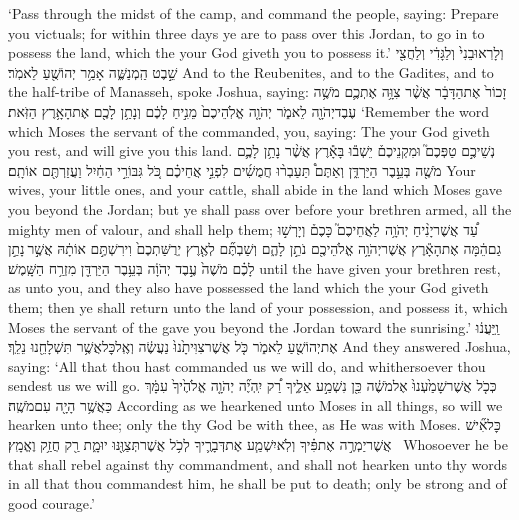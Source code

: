 {‘Pass through the midst of the camp, and command the people, saying: Prepare you victuals; for within three days ye are to pass over this Jordan, to go in to possess the land, which the \lord\space your God giveth you to possess it.’}
{וְלָרֽאוּבֵנִי֙ וְלַגָּדִ֔י וְלַחֲצִ֖י שֵׁ֣בֶט הַֽמְנַשֶּׁ֑ה אָמַ֥ר יְהוֹשֻׁ֖עַ לֵאמֹֽר׃}
{And to the Reubenites, and to the Gadites, and to the half-tribe of Manasseh, spoke Joshua, saying:}
{זָכוֹר֙ אֶת\maqqaf הַדָּבָ֔ר אֲשֶׁ֨ר צִוָּ֥ה אֶתְכֶ֛ם מֹשֶׁ֥ה עֶבֶד\maqqaf יְהֹוָ֖ה לֵאמֹ֑ר יְהֹוָ֤ה אֱלֹֽהֵיכֶם֙ מֵנִ֣יחַ לָכֶ֔ם וְנָתַ֥ן לָכֶ֖ם אֶת\maqqaf הָאָ֥רֶץ הַזֹּֽאת׃}
{‘Remember the word which Moses the servant of the \lord\space commanded, you, saying: The \lord\space your God giveth you rest, and will give you this land.}
{נְשֵׁיכֶ֣ם טַפְּכֶם֮ וּמִקְנֵיכֶם֒ יֵשְׁב֕וּ בָּאָ֕רֶץ אֲשֶׁ֨ר נָתַ֥ן לָכֶ֛ם מֹשֶׁ֖ה בְּעֵ֣בֶר הַיַּרְדֵּ֑ן וְאַתֶּם֩ תַּעַבְר֨וּ חֲמֻשִׁ֜ים לִפְנֵ֣י אֲחֵיכֶ֗ם כֹּ֚ל גִּבּוֹרֵ֣י הַחַ֔יִל וַעֲזַרְתֶּ֖ם אוֹתָֽם׃}
{Your wives, your little ones, and your cattle, shall abide in the land which Moses gave you beyond the Jordan; but ye shall pass over before your brethren armed, all the mighty men of valour, and shall help them;}
{עַ֠ד אֲשֶׁר\maqqaf יָנִ֨יחַ יְהֹוָ֥ה \pasek  לַאֲחֵיכֶם֮ כָּכֶם֒ וְיָרְשׁ֣וּ גַם\maqqaf הֵ֔מָּה אֶת\maqqaf הָאָ֕רֶץ אֲשֶׁר\maqqaf יְהֹוָ֥ה אֱלֹהֵיכֶ֖ם נֹתֵ֣ן לָהֶ֑ם וְשַׁבְתֶּ֞ם לְאֶ֤רֶץ יְרֻשַּׁתְכֶם֙ וִירִשְׁתֶּ֣ם אוֹתָ֔הּ אֲשֶׁ֣ר \legarmeh  נָתַ֣ן לָכֶ֗ם מֹשֶׁה֙ עֶ֣בֶד יְהֹוָ֔ה בְּעֵ֥בֶר הַיַּרְדֵּ֖ן מִזְרַ֥ח הַשָּֽׁמֶשׁ׃}
{until the \lord\space have given your brethren rest, as unto you, and they also have possessed the land which the \lord\space your God giveth them; then ye shall return unto the land of your possession, and possess it, which Moses the servant of the \lord\space gave you beyond the Jordan toward the sunrising.’}
{וַֽיַּעֲנ֔וּ אֶת\maqqaf יְהוֹשֻׁ֖עַ לֵאמֹ֑ר כֹּ֤ל אֲשֶׁר\maqqaf צִוִּיתָ֙נוּ֙ נַעֲשֶׂ֔ה וְאֶֽל\maqqaf כׇּל\maqqaf אֲשֶׁ֥ר תִּשְׁלָחֵ֖נוּ נֵלֵֽךְ׃}
{And they answered Joshua, saying: ‘All that thou hast commanded us we will do, and whithersoever thou sendest us we will go.}
{כְּכֹ֤ל אֲשֶׁר\maqqaf שָׁמַ֙עְנוּ֙ אֶל\maqqaf מֹשֶׁ֔ה כֵּ֖ן נִשְׁמַ֣ע אֵלֶ֑יךָ רַ֠ק יִֽהְיֶ֞ה יְהֹוָ֤ה אֱלֹהֶ֙יךָ֙ עִמָּ֔ךְ כַּאֲשֶׁ֥ר הָיָ֖ה עִם\maqqaf מֹשֶֽׁה׃}
{According as we hearkened unto Moses in all things, so will we hearken unto thee; only the \lord\space thy God be with thee, as He was with Moses.}
{כׇּל\maqqaf אִ֞ישׁ אֲשֶׁר\maqqaf יַמְרֶ֣ה אֶת\maqqaf פִּ֗יךָ וְלֹֽא\maqqaf יִשְׁמַ֧ע אֶת\maqqaf דְּבָרֶ֛יךָ לְכֹ֥ל אֲשֶׁר\maqqaf תְּצַוֶּ֖נּוּ יוּמָ֑ת רַ֖ק חֲזַ֥ק וֶאֱמָֽץ׃ \petucha }
{Whosoever he be that shall rebel against thy commandment, and shall not hearken unto thy words in all that thou commandest him, he shall be put to death; only be strong and of good courage.’}
